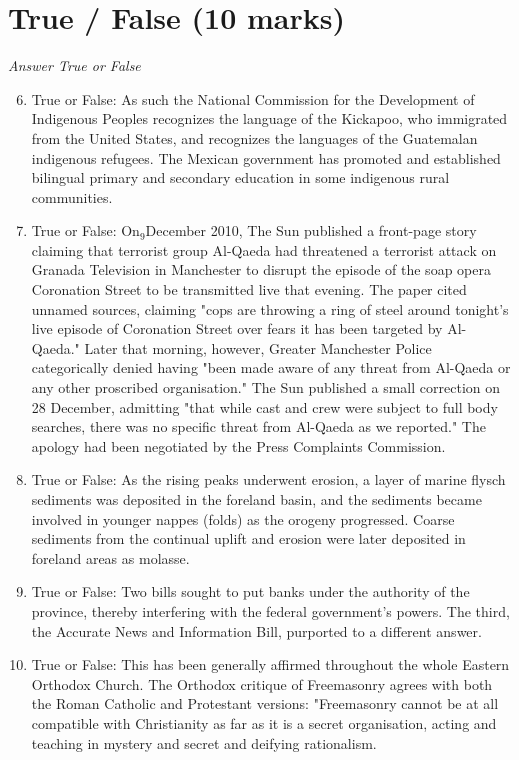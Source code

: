 \documentclass[12pt]{article}
\begin{document}
\section*{True / False (10 marks)}
\textit{Answer True or False}
\begin{enumerate}[label=\arabic*.]
\setcounter{enumi}{5}
\item True or False: As such the National Commission for the Development of Indigenous Peoples recognizes the language of the Kickapoo, who immigrated from the United States, and recognizes the languages of the Guatemalan indigenous refugees. The Mexican government has promoted and established bilingual primary and secondary education in some indigenous rural communities.
\item True or False: On$_{9}$December 2010, The Sun published a front-page story claiming that terrorist group Al-Qaeda had threatened a terrorist attack on Granada Television in Manchester to disrupt the episode of the soap opera Coronation Street to be transmitted live that evening. The paper cited unnamed sources, claiming "cops are throwing a ring of steel around tonight's live episode of Coronation Street over fears it has been targeted by Al-Qaeda." Later that morning, however, Greater Manchester Police categorically denied having "been made aware of any threat from Al-Qaeda or any other proscribed organisation." The Sun published a small correction on 28 December, admitting "that while cast and crew were subject to full body searches, there was no specific threat from Al-Qaeda as we reported." The apology had been negotiated by the Press Complaints Commission.
\item True or False: As the rising peaks underwent erosion, a layer of marine flysch sediments was deposited in the foreland basin, and the sediments became involved in younger nappes (folds) as the orogeny progressed. Coarse sediments from the continual uplift and erosion were later deposited in foreland areas as molasse.
\item True or False: Two bills sought to put banks under the authority of the province, thereby interfering with the federal government's powers. The third, the Accurate News and Information Bill, purported to a different answer.
\item True or False: This has been generally affirmed throughout the whole Eastern Orthodox Church. The Orthodox critique of Freemasonry agrees with both the Roman Catholic and Protestant versions: "Freemasonry cannot be at all compatible with Christianity as far as it is a secret organisation, acting and teaching in mystery and secret and deifying rationalism.
\end{enumerate}
\end{document}
